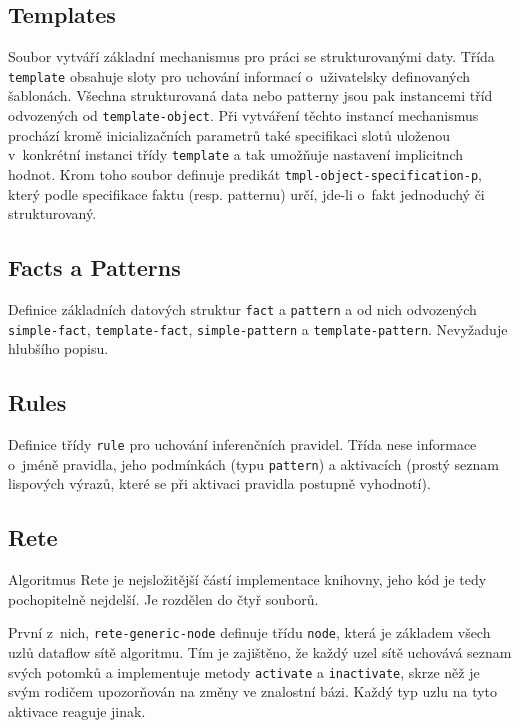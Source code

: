 \subsection{Templates}
Soubor vytváří základní mechanismus pro práci se strukturovanými daty.
Třída \verb|template| obsahuje sloty pro uchování informací o~uživatelsky
definovaných šablonách. Všechna strukturovaná data nebo patterny jsou pak
instancemi tříd odvozených od \verb|template-object|. Při vytváření těchto
instancí mechanismus prochází kromě inicializačních parametrů také specifikaci
slotů uloženou v~konkrétní instanci třídy \verb|template| a tak umožňuje
nastavení implicitnch hodnot. Krom toho soubor definuje predikát
\verb|tmpl-object-specification-p|, který podle specifikace faktu (resp.
patternu) určí, jde-li o~fakt jednoduchý či strukturovaný.
\subsection{Facts a Patterns}
Definice základních datových struktur \verb|fact| a \verb|pattern| a od nich
odvozených \verb|simple-fact|, \verb|template-fact|, \verb|simple-pattern|
a \verb|template-pattern|. Nevyžaduje hlubšího popisu.
\subsection{Rules}
Definice třídy \verb|rule| pro uchování inferenčních pravidel. Třída nese
informace o~jméně pravidla, jeho podmínkách (typu \verb|pattern|) a aktivacích
(prostý seznam lispových výrazů, které se při aktivaci pravidla postupně
vyhodnotí).
\subsection{Rete}
Algoritmus Rete je nejsložitější částí implementace knihovny, jeho kód je tedy
pochopitelně nejdelší. Je rozdělen do čtyř souborů.

První z~nich, \verb|rete-generic-node| definuje třídu \verb|node|, která je
základem všech uzlů dataflow sítě algoritmu. Tím je zajištěno, že každý uzel
sítě uchovává seznam svých potomků a implementuje metody \verb|activate|
a \verb|inactivate|, skrze něž je svým rodičem upozorňován na změny ve znalostní
bázi. Každý typ uzlu na tyto aktivace reaguje jinak.

